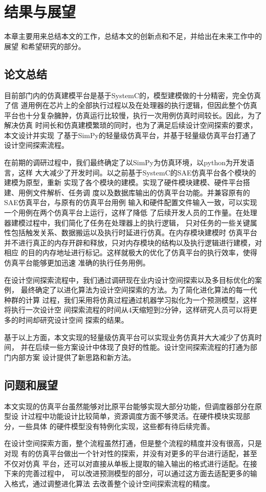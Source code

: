 
\chapter{结果与展望}

本章主要用来总结本文的工作，总结本文的创新点和不足，并给出在未来工作中的展望
和希望研究的部分。

\section{论文总结}

目前部门内的仿真建模平台是基于SystemC的，模型建模做的十分精密，完全仿真了信
道用例在芯片上的全部执行过程以及在处理器的执行逻辑，但因此整个仿真
平台也十分复杂臃肿，仿真运行比较慢，执行一次用例仿真时间较长。因此，为了解决仿真
时间长和仿真建模繁琐的同时，也为了满足后续设计空间探索的要求，本文设计并实现
了基于SimPy的轻量级仿真平台，并基于轻量级仿真平台打通了设计空间探索流程。

在前期的调研过程中，我们最终确定了以SimPy为仿真环境，以python为开发语言，这样
大大减少了开发时间。以之前基于SystemC的SAE仿真平台各个模块的建模为原型，重新
实现了各个模块的建模。实现了硬件模块建模、硬件平台搭建、用例文件解析、任务调
度以及数据库输出的仿真平台功能。并兼容原有的SAE仿真平台，与原有的仿真平台用例
输入和硬件配置文件输入一致，可以实现一个用例在两个仿真平台上运行，这样了降低
了后续开发人员的工作量。在处理器建模过程中，我们简化了任务在处理器上的执行逻辑，
只对任务的一些关键属性包括触发关系、数据搬运以及执行时延进行仿真。在内存模块建模时
仿真平台并不进行真正的内存开辟和释放，只对内存模块的结构以及执行逻辑进行建模，对相应
的目的内存地址进行标记。这样就极大的优化了仿真平台的执行效率，使得仿真平台能够更加迅速
准确的执行任务用例。

在设计空间探索流程中，我们通过调研现在业内设计空间探索以及多目标优化的案例，
最终确定了以进化算法为设计空间探索的方法。为了简化进化算法的每一代种群的计算
过程，我们采用将仿真过程通过机器学习拟化为一个预测模型，这样将执行一次设计空
间探索流程的时间从4天缩短到2分钟，这样研究人员可以将更多的时间却研究设计空间
探索的结果。

基于以上方面，本文实现的轻量级仿真平台可以实现业务仿真并大大减少了仿真时间，
并在后续一些方案设计中体现了良好的性能。设计空间探索流程的打通为部门内部方案
设计提供了新思路和新方法。

\section{问题和展望}

本文实现的仿真平台虽然能够对比原平台能够实现大部分功能，但调度器部分在原型设
计过程中功能设计比较简单，资源调度方面不够灵活。在硬件模块实现部分，一些具体
的硬件模型没有特例化实现，这些都有待后续完善。

在设计空间探索方面，整个流程虽然打通，但是整个流程的精度并没有很高，只是对现
有的仿真平台做出一个针对性的探索，并没有对更多的平台进行适配，甚至不仅对仿真
平台，还可以对直接从单板上提取的输入输出的格式进行适配。在接下来的完善过程中，
可以改进预测模型的部分，可以通过这方面去适配更多的输入格式，通过调整进化算法
去改善整个设计空间探索流程的精度。


